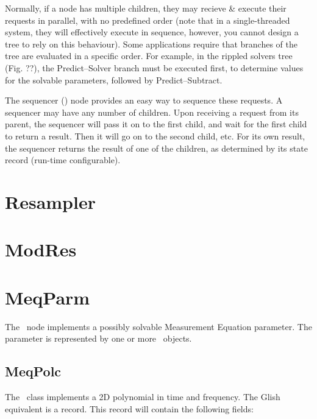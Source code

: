   Normally, if a node has multiple children, they may recieve \& execute their
  requests in parallel, with no predefined order (note that in a
  single-threaded system, they will effectively execute in sequence, however,
  you cannot design a tree to rely on this behaviour). Some applications
  require that branches of the tree are evaluated in a specific order. For
  example, in the rippled solvers tree (Fig. ??), the Predict--Solver branch
  must be executed first, to determine values for the solvable parameters,
  followed by Predict--Subtract.
  
  The sequencer () node provides an easy way to sequence these
  requests. A sequencer may have any number of children. Upon receiving a
  request from its parent, the sequencer will pass it on to the first child,
  and wait for the first child to return a result. Then it will go on to the
  second child, etc. For its own result, the sequencer returns the result of
  one of the children, as determined by its state record (run-time
  configurable).

\section{Resampler}

\section{ModRes}

\section{MeqParm}

  The \Parm\ node implements a possibly solvable Measurement Equation
  parameter. The parameter is represented by one or more \Polc\ objects.

\subsection{MeqPolc}

  The \Polc\ class implements a 2D polynomial in time and frequency. The Glish
  equivalent is a  record. This record will contain the following
  fields:
  

